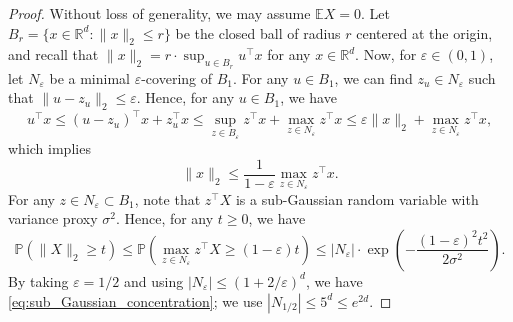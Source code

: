 \documentclass[10pt,a4paper]{amsart}
\newcommand{\E}{\mathbb{E}} %
\renewcommand{\P}{\mathbb{P}}
\newcommand{\R}{\mathbb{R}}
\renewcommand{\epsilon}{\varepsilon}
\begin{document}
\begin{proof}
    Without loss of generality, we may assume $\E X = 0$. Let $B_r = \{x \in \R^d : \|x\|_2 \le r\}$ be the closed ball of radius $r$ centered at the origin, and recall that $\|x\|_2 = r \cdot \sup_{u \in B_r} u^\top x$ for any $x \in \R^d$. Now, for $\epsilon \in (0, 1)$, let $N_\epsilon$ be a minimal $\epsilon$-covering of $B_1$. For any $u \in B_1$, we can find $z_u \in N_\epsilon$ such that $\|u - z_u\|_2 \le \epsilon$. Hence, for any $u \in B_1$, we have
    \begin{equation*}
        u^\top x \le (u - z_u)^\top x + z_u^\top x \le \sup_{z \in B_\epsilon} z^\top x + \max_{z \in N_\epsilon} z^\top x \le \epsilon \|x\|_2 + \max_{z \in N_\epsilon} z^\top x,
    \end{equation*}
    which implies 
    \begin{equation*}
        \|x\|_2 \le \frac{1}{1 - \epsilon} \max_{z \in N_\epsilon} z^\top x.
    \end{equation*}
    For any $z \in N_\epsilon \subset B_1$, note that $z^\top X$ is a sub-Gaussian random variable with variance proxy $\sigma^2$. Hence, for any $t \ge 0$, we have 
    \begin{equation*}
        \P(\|X\|_2 \ge t) 
        \le \P(\max_{z \in N_\epsilon} z^\top X \ge (1 - \epsilon) t) \le |N_\epsilon| \cdot \exp\left(-\frac{(1 - \epsilon)^2 t^2}{2 \sigma^2}\right).
    \end{equation*}
    By taking $\epsilon = 1 / 2$ and using $|N_\epsilon| \le (1 + 2 / \epsilon)^d$, we have \eqref{eq:sub_Gaussian_concentration}; we use $|N_{1 / 2}| \le 5^d \le e^{2 d}$.
\end{proof}
\end{document}
